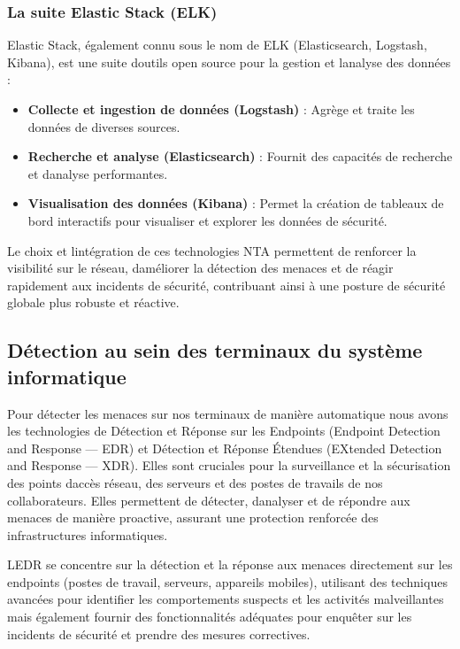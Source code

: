 \documentclass[
  11pt,
  a4paper,
  krantz2,
  11pt,
  oneside]{krantz}
\begin{document}
\subsubsection{La suite Elastic Stack (ELK)}\label{la-suite-elastic-stack-elk}

Elastic Stack, également connu sous le nom de ELK (Elasticsearch, Logstash, Kibana), est une suite d\textquotesingle outils open source pour la gestion et l\textquotesingle analyse des données :

\begin{itemize}
\item
  \textbf{Collecte et ingestion de données (Logstash)} : Agrège et traite les données de diverses sources.
\item
  \textbf{Recherche et analyse (Elasticsearch)} : Fournit des capacités de recherche et d\textquotesingle analyse performantes.
\item
  \textbf{Visualisation des données (Kibana)} : Permet la création de tableaux de bord interactifs pour visualiser et explorer les données de sécurité.
\end{itemize}

Le choix et l\textquotesingle intégration de ces technologies NTA permettent de renforcer la visibilité sur le réseau, d\textquotesingle améliorer la détection des menaces et de réagir rapidement aux incidents de sécurité, contribuant ainsi à une posture de sécurité globale plus robuste et réactive.

\subsection{Détection au sein des terminaux du système informatique}\label{duxe9tection-au-sein-des-terminaux-du-systuxe8me-informatique}

Pour détecter les menaces sur nos terminaux de manière automatique nous avons les technologies de Détection et Réponse sur les Endpoints (Endpoint Detection and Response --- EDR) et Détection et Réponse Étendues (EXtended Detection and Response --- XDR). Elles sont cruciales pour la surveillance et la sécurisation des points d\textquotesingle accès réseau, des serveurs et des postes de travails de nos collaborateurs. Elles permettent de détecter, d\textquotesingle analyser et de répondre aux menaces de manière proactive, assurant une protection renforcée des infrastructures informatiques.

L\textquotesingle EDR se concentre sur la détection et la réponse aux menaces directement sur les endpoints (postes de travail, serveurs, appareils mobiles), utilisant des techniques avancées pour identifier les comportements suspects et les activités malveillantes mais également fournir des fonctionnalités adéquates pour enquêter sur les incidents de sécurité et prendre des mesures correctives.
\end{document}
